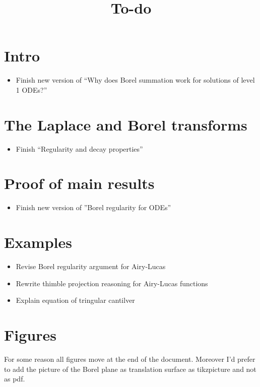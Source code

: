 \documentclass{article}
\title{To-do}
\date{}
\begin{document}
\maketitle
\section{Intro}
\begin{itemize}
\item Finish new version of ``Why does Borel summation work for solutions of level 1 ODEs?''
\end{itemize}
\section{The Laplace and Borel transforms}
\begin{itemize}
\item Finish ``Regularity and decay properties''
\end{itemize}
\section{Proof of main results}
\begin{itemize}
    \item Finish new version of ''Borel regularity for ODEs''
\end{itemize}
\section{Examples}
\begin{itemize}
\item Revise Borel regularity argument for Airy-Lucas
\item Rewrite thimble projection reasoning for Airy-Lucas functions
\item Explain equation of tringular cantilver
\end{itemize}
\section{Figures}
For some reason all figures move at the end of the document. Moreover I'd prefer to add the picture of the Borel plane as translation surface as tikzpicture and not as pdf.
\end{document}
